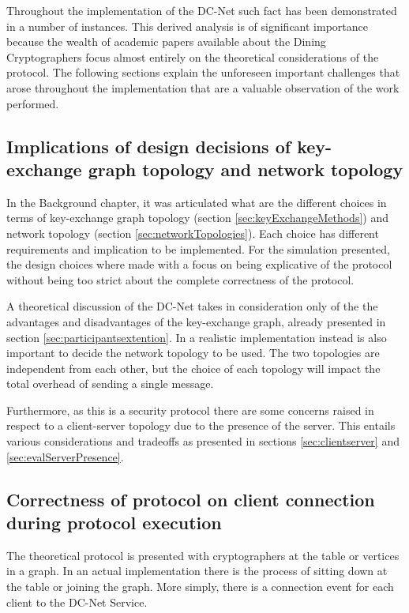 Throughout the implementation of the DC-Net such fact has been demonstrated in a number of instances. This derived analysis is of significant importance because the wealth of academic papers available about the Dining Cryptographers focus almost entirely on the theoretical considerations of the protocol. The following sections explain the unforeseen important challenges that arose throughout the implementation that are a valuable observation of the work performed.

\subsection{Implications of design decisions of key-exchange graph topology and network topology}
In the Background chapter, it was articulated what are the different choices in terms of key-exchange graph topology (section \ref{sec:keyExchangeMethods}) and network topology (section \ref{sec:networkTopologies}). Each choice has different requirements and implication to be implemented. For the simulation presented, the design choices where made with a focus on being explicative of the protocol without being too strict about the complete correctness of the protocol.

A theoretical discussion of the DC-Net takes in consideration only of the the advantages and disadvantages of the key-exchange graph, already presented in section \ref{sec:participantsextention}. In a realistic implementation instead is also important to decide the network topology to be used. The two topologies are independent from each other, but the choice of each topology will impact the total overhead of sending a single message.

Furthermore, as this is a security protocol there are some concerns raised in respect to a client-server topology due to the presence of the server. This entails various considerations and tradeoffs as presented in sections \ref{sec:clientserver} and \ref{sec:evalServerPresence}.

\subsection{Correctness of protocol on client connection during protocol execution}
The theoretical protocol is presented with cryptographers at the table or vertices in a graph. In an actual implementation there is the process of sitting down at the table or joining the graph. More simply, there is a connection event for each client to the DC-Net Service. 

